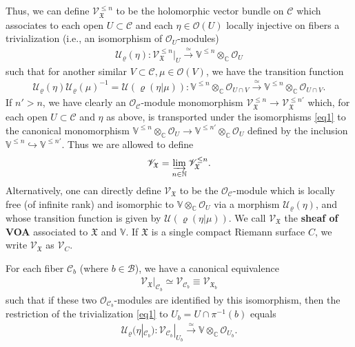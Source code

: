 \documentclass[12pt,a4paper,notitlepage]{article}
\theoremstyle{definition}
\theoremstyle{plain}
\newcommand{\fk}{\mathfrak}
\newcommand{\mc}{\mathcal}
\newcommand{\scr}{\mathscr}
\newcommand{\Vbb}{\mathbb V}
\newcommand{\Cbb}{\mathbb C}
\newcommand{\Nbb}{\mathbb N}
\numberwithin{equation}{section}
\begin{document}
Thus, we can define $\scr V_{\fk X}^{\leq n}$  to be the holomorphic vector bundle on $\mc C$ which associates to each open $U\subset\mc C$ and each $\eta\in\scr O(U)$ locally injective on fibers a trivialization (i.e., an isomorphism of $\scr O_U$-modules) \index{U@$\mc U_\varrho(\eta)$}
\begin{align}
\mc U_\varrho(\eta):\scr V_{\fk X}^{\leq n}|_U\xrightarrow{\simeq}\Vbb^{\leq n}\otimes_\Cbb\scr O_U	\label{eq1}
\end{align}
such that for another similar $V\subset\mc C,\mu\in\scr O(V)$, we have the transition function
\begin{align}
\mc U_\varrho(\eta)\mc U_\varrho(\mu)^{-1}=\mc U(\varrho(\eta|\mu)):\Vbb^{\leq n}\otimes_\Cbb\scr O_{U\cap V}\xrightarrow{\simeq}\Vbb^{\leq n}\otimes_\Cbb\scr O_{U\cap V}. \label{eq12}
\end{align} 
If $n'>n$, we have clearly an  $\scr O_{\mc C}$-module monomorphism $\scr V_{\fk X}^{\leq n}\rightarrow\scr V_{\fk X}^{\leq n'}$ which, for each open $U\subset\mc C$ and $\eta$ as above, is transported under the isomorphisms \eqref{eq1} to the canonical monomorphism $\Vbb^{\leq n}\otimes_\Cbb\scr O_U\rightarrow\Vbb^{\leq n'}\otimes_\Cbb\scr O_U$ defined by the inclusion $\Vbb^{\leq n}\hookrightarrow\Vbb^{\leq n'}$. Thus we are allowed to define
\begin{align*}
\scr V_{\fk X}=\varinjlim_{n\in\Nbb}\scr V_{\fk X}^{\leq n}.
\end{align*}
Alternatively, one can directly define $\scr V_{\fk X}$ to be the $\scr O_{\mc C}$-module which is locally free (of infinite rank) and isomorphic to $\Vbb\otimes_\Cbb\scr O_U$ via a morphism $\mc U_\varrho(\eta)$, and whose transition function is given by $\mc U(\varrho(\eta|\mu))$. We call $\scr V_{\fk X}$ the \textbf{sheaf of VOA} associated to $\fk X$ and $\Vbb$. If $\fk X$ is a single compact Riemann surface $C$, we write $\scr V_{\fk X}$ as $\scr V_C$. \index{V@$\scr V_{\fk X}^{\leq n},\scr V_{\fk X},\scr V_C$}

For each fiber $\mc C_b$ (where $b\in\mc B$), we have a canonical equivalence
\begin{align}
\scr V_{\fk X}|_{\mc C_b}\simeq\scr V_{\mc C_b}\equiv\scr V_{\fk X_b}\label{eq15}
\end{align}
such that if these two $\scr O_{\mc C_b}$-modules are identified by this isomorphism, then  the restriction of the trivialization \eqref{eq1} to $U_b=U\cap\pi^{-1}(b)$ equals
\begin{align*}
\mc U_\varrho(\eta|_{\mc C_b}):\scr V_{\mc C_b}|_{U_b}\xrightarrow{\simeq}\Vbb\otimes_\Cbb\scr O_{U_b}.
\end{align*}
\end{document}
